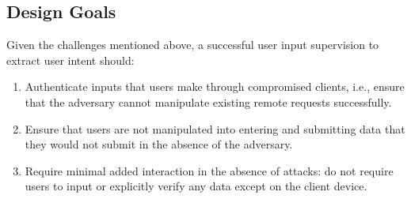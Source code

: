 \subsection{Design Goals}
\label{sec:systemDesign:designgolaks}

 Given the challenges mentioned above, a successful user input supervision to extract user intent should:

\begin{enumerate}
	\item Authenticate inputs that users make through compromised clients, i.e., ensure that the adversary cannot manipulate existing remote requests successfully.

	\item Ensure that users are not manipulated into entering and submitting data that they would not submit in the absence of the adversary.

	\item Require minimal added interaction in the absence of attacks: do not require users to input or explicitly verify any data except on the client device.
\end{enumerate}